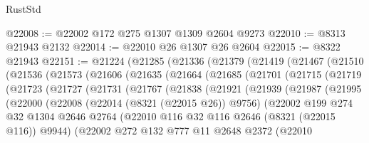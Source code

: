 \begin{lexlean}{RustStd}
\begin{coremodule}
@22008 := @22002 @172 @275 @1307 @1309 @2604 @9273
@22010 := @8313 @21943 @2132
@22014 := @22010 @26 @1307 @26 @2604
@22015 := @8322 @21943
@22151 := @21224
    (@21285
      (@21336
        (@21379
          (@21419
            (@21467
              (@21510
                (@21536
                  (@21573
                    (@21606
                      (@21635
                        (@21664
                          (@21685
                            (@21701
                              (@21715
                                (@21719
                                  (@21723
                                    (@21727
                                      (@21731
                                        (@21767
                                          (@21838
                                            (@21921
                                              (@21939
                                                (@21987
                                                  (@21995
                                                    (@22000
                                                      (@22008
                                                        (@22014 (@8321 (@22015 @26)) @9756)
                                                        (@22002
                                                          @199
                                                          @274
                                                          @32
                                                          @1304
                                                          @2646
                                                          @2764
                                                          (@22010
                                                            @116
                                                            @32
                                                            @116
                                                            @2646
                                                            (@8321 (@22015 @116))
                                                            @9944)
                                                          (@22002
                                                            @272
                                                            @132
                                                            @777
                                                            @11
                                                            @2648
                                                            @2372
                                                            (@22010

\end{coremodule}
\end{lexlean}
